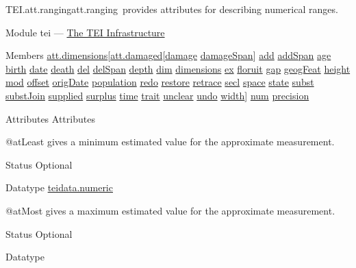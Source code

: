 \begin{reflist}
\item[]\begin{specHead}{TEI.att.ranging}{att.ranging} provides attributes for describing numerical ranges.\end{specHead} 
    \item[{Module}]
  tei — \hyperref[ST]{The TEI Infrastructure}
    \item[{Members}]
  \hyperref[TEI.att.dimensions]{att.dimensions}[\hyperref[TEI.att.damaged]{att.damaged}[\hyperref[TEI.damage]{damage} \hyperref[TEI.damageSpan]{damageSpan}] \hyperref[TEI.add]{add} \hyperref[TEI.addSpan]{addSpan} \hyperref[TEI.age]{age} \hyperref[TEI.birth]{birth} \hyperref[TEI.date]{date} \hyperref[TEI.death]{death} \hyperref[TEI.del]{del} \hyperref[TEI.delSpan]{delSpan} \hyperref[TEI.depth]{depth} \hyperref[TEI.dim]{dim} \hyperref[TEI.dimensions]{dimensions} \hyperref[TEI.ex]{ex} \hyperref[TEI.floruit]{floruit} \hyperref[TEI.gap]{gap} \hyperref[TEI.geogFeat]{geogFeat} \hyperref[TEI.height]{height} \hyperref[TEI.mod]{mod} \hyperref[TEI.offset]{offset} \hyperref[TEI.origDate]{origDate} \hyperref[TEI.population]{population} \hyperref[TEI.redo]{redo} \hyperref[TEI.restore]{restore} \hyperref[TEI.retrace]{retrace} \hyperref[TEI.secl]{secl} \hyperref[TEI.space]{space} \hyperref[TEI.state]{state} \hyperref[TEI.subst]{subst} \hyperref[TEI.substJoin]{substJoin} \hyperref[TEI.supplied]{supplied} \hyperref[TEI.surplus]{surplus} \hyperref[TEI.time]{time} \hyperref[TEI.trait]{trait} \hyperref[TEI.unclear]{unclear} \hyperref[TEI.undo]{undo} \hyperref[TEI.width]{width}] \hyperref[TEI.num]{num} \hyperref[TEI.precision]{precision}
    \item[{Attributes}]
  Attributes\hfil\\[-10pt]\begin{sansreflist}
    \item[@atLeast]
  gives a minimum estimated value for the approximate measurement.
\begin{reflist}
    \item[{Status}]
  Optional
    \item[{Datatype}]
  \hyperref[TEI.teidata.numeric]{teidata.numeric}
\end{reflist}  
    \item[@atMost]
  gives a maximum estimated value for the approximate measurement.
\begin{reflist}
    \item[{Status}]
  Optional
    \item[{Datatype}]

\end{reflist}
\end{sansreflist}
\end{reflist}
